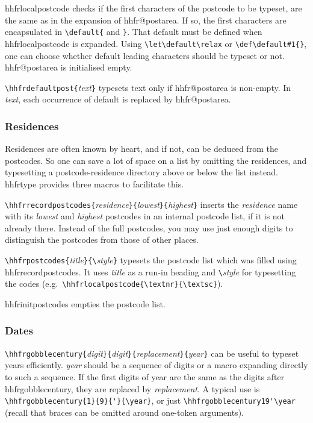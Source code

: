 \documentclass[11pt]{article}
\makeatletter
\def\packagename#1{{\sffamily #1}}     %
\def\macroname#1{{\ttfamily\@ttbs#1}}  %
\def\hhfrtype{\packagename{hhfrtype}\xspace}
\def\={\verb=}
\def\<#1>{\macroname{#1}}
\makeatother
\begin{document}
\<hhfrlocalpostcode> checks if the first characters of the postcode to
be typeset, are the same as in the expansion of \<hhfr@postarea>.
If so, the first characters are encapsulated in \=\default{= and \=}=.
That \<default> must be defined when \<hhfrlocalpostcode> is expanded.
Using \=\let\default\relax= or \=\def\default#1{}=, one can choose
whether default leading characters should be typeset or not.
\<hhfr@postarea> is initialised empty.

\=\hhfrdefaultpost{=\textit{text}\=}= typesets text only if \<hhfr@postarea>
is non-empty. In \textit{text}, each occurrence of \<default>
is replaced by \<hhfr@postarea>.

\subsubsection{Residences}
Residences are often known by heart, and if not, can be deduced from
the postcodes. So one can save a lot of space on a list by omitting
the residences, and typesetting a postcode-residence directory above
or below the list instead. \hhfrtype provides three macros to
facilitate this.

\=\hhfrrecordpostcodes{=\textit{residence}\=}{=\textit{lowest}\=}{=\textit{highest}\=}=
inserts the \textit{residence} name with its \textit{lowest} and \textit{highest}
postcodes in an internal postcode list, if it is not already there. Instead
of the full postcodes, you may use just enough digits to distinguish the
postcodes from those of other places.

\=\hhfrpostcodes{=\textit{title}\=}{\=\textit{style}\=}=
typesets the postcode list which was filled using \<hhfrrecordpostcodes>.
It uses \textit{title} as a run-in heading and \=\=\textit{style}
for typesetting the codes (e.g.\ \=\hhfrlocalpostcode{\textnr}{\textsc}=).

\<hhfrinitpostcodes> empties the postcode list.

\subsubsection{Dates}
\=\hhfrgobblecentury{=\textit{digit}\=}{=\textit{digit}\=}{=\textit{replacement}\=}{=\textit{year}\=}=
can be useful to typeset years efficiently. \textit{year} should be a sequence of digits
or a macro expanding directly to such a sequence. If the first digits of
year are the same as the digits after \<hhfrgobblecentury>, they are replaced
by \textit{replacement}. A typical use is \=\hhfrgobblecentury{1}{9}{'}{\year}=,
or just \=\hhfrgobblecentury19'\year= (recall that braces can be omitted around
one-token arguments).
\end{document}

